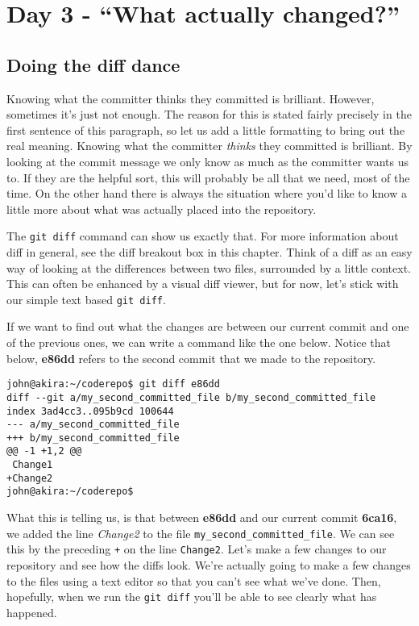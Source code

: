 \section{Day 3 - ``What actually changed?''}
\subsection{Doing the diff dance}

Knowing what the committer thinks they committed is brilliant.  However, sometimes it's just not enough.  The reason for this is stated fairly precisely in the first sentence of this paragraph, so let us add a little formatting to bring out the real meaning.  Knowing what the committer \emph{thinks} they committed is brilliant.  By looking at the commit message we only know as much as the committer wants us to.  If they are the helpful sort, this will probably be all that we need, most of the time.  On the other hand there is always the situation where you'd like to know a little more about what was actually placed into the repository.

The \texttt{git diff} command can show us exactly that.  For more information about diff in general, see the diff breakout box in this chapter.  Think of a diff as an easy way of looking at the differences between two files, surrounded by a little context.  This can often be enhanced by a visual diff viewer, but for now, let's stick with our simple text based \texttt{git diff}.  

If we want to find out what the changes are between our current commit and one of the previous ones, we can write a command like the one below.  Notice that below, \textbf{e86dd} refers to the second commit that we made to the repository.  

\begin{Verbatim}[frame=leftline,framerule=1mm,fontsize=\relsize{-3}] 
john@akira:~/coderepo$ git diff e86dd
diff --git a/my_second_committed_file b/my_second_committed_file
index 3ad4cc3..095b9cd 100644
--- a/my_second_committed_file
+++ b/my_second_committed_file
@@ -1 +1,2 @@
 Change1
+Change2
john@akira:~/coderepo$ 
\end{Verbatim}

What this is telling us, is that between \textbf{e86dd} and our current commit \textbf{6ca16}, we added the line \emph{Change2} to the file \texttt{my\_second\_committed\_file}.  We can see this by the preceding \texttt{+} on the line \texttt{Change2}.  Let's make a few changes to our repository and see how the diffs look.  We're actually going to make a few changes to the files using a text editor so that you can't see what we've done.  Then, hopefully, when we run the \texttt{git diff} you'll be able to see clearly what has happened.

